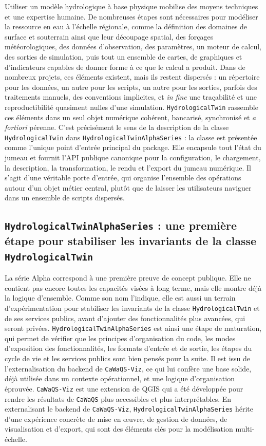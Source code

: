 \documentclass[11pt,a4paper]{article}
\newcommand{\hydrot}{\texttt{HydrologicalTwin}}
\newcommand{\alphaht}{\texttt{HydrologicalTwinAlphaSeries}}
\newcommand{\cwv}{\texttt{CaWaQS-Viz}}
\newcommand{\caw}{\texttt{CaWaQS}}
\begin{document}
Utiliser un modèle hydrologique à base physique mobilise des moyens techniques et une expertise humaine. De nombreuses étapes sont nécessaires pour modéliser la ressource en eau à l'échelle régionale, comme la définition des domaines de surface et souterrain ainsi que leur découpage spatial, des forçages météorologiques, des données d'observation, des paramètres, un moteur de calcul, des sorties de simulation, puis tout un ensemble de cartes, de graphiques et d'indicateurs capables de donner forme à ce que le calcul a produit. 
Dans de nombreux projets, ces éléments existent, mais ils restent dispersés : un répertoire pour les données, un autre pour les scripts, un autre pour les sorties, parfois des traitements manuels, des conventions implicites, et \textit{in fine} une traçabilité et une reproductibilité quasiment nulles d'une simulation. 
\hydrot{}  rassemble ces éléments dans un seul objet numérique cohérent, bancarisé, synchronisé et \textit{a fortiori} pérenne. C'est précisément le sens de la description de la classe \texttt{HydrologicalTwin} dans \alphaht{} : la classe est présentée comme \og l'unique point d'entrée principal \fg{} du package. Elle encapsule tout l'état du jumeau et fournit l'API publique canonique pour la configuration, le chargement, la description, la transformation, le rendu et l'export du jumeau numérique. Il s'agit d'une véritable porte d'entrée, qui organise l'ensemble des opérations autour d'un objet métier central, plutôt que de laisser les utilisateurs naviguer dans un ensemble de scripts dispersés.

\subsection{\alphaht{} : une première étape pour stabiliser les invariants de la classe \texttt{HydrologicalTwin}}

La série Alpha correspond à une première preuve de concept publique. Elle ne contient pas encore toutes les capacités visées à long terme, mais elle montre déjà la logique d'ensemble. Comme son nom l'indique, elle est aussi un terrain d'expérimentation pour stabiliser les invariants de la classe \hydrot{} et de ses services publics, avant d'ajouter des fonctionnalités plus avancées, qui seront privées. \alphaht{} est ainsi une étape de maturation, qui permet de vérifier que les principes d'organisation du code, les modes d'exposition des fonctionnalités, les formats d'entrée et de sortie, les étapes du cycle de vie et les services publics sont bien pensés pour la suite. Il est issu de l'externalisation du backend de \cwv{}, ce qui lui confère une base solide, déjà utilisée dans un contexte opérationnel, et une logique d'organisation éprouvée. \cwv{} est une extension de QGIS qui a été développée pour rendre les résultats de \caw{} plus accessibles et plus interprétables. En externalisant le backend de \cwv{}, \alphaht{} hérite d'une expérience concrète de mise en œuvre, de gestion de données, de visualisation et d'export, qui sont des éléments clés pour la modélisation multi-échelle.
\end{document}
